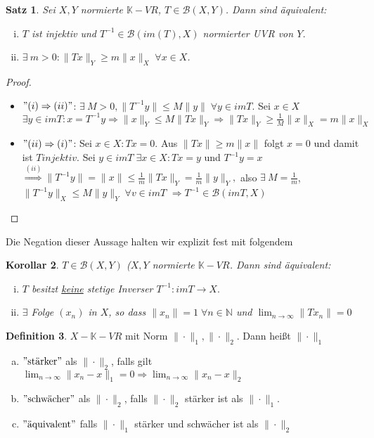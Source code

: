 \documentclass[ngerman]{report}
\theoremstyle{plain}%
\newtheorem{thm}{Satz}[chapter]
\newtheorem{cor}[thm]{Korollar}
\theoremstyle{definition}%
\newtheorem{definition}[thm]{Definition}
\theoremstyle{myStyle}
\newcommand{\N}{\mathbb{N}}
\newcommand{\K}{\mathbb{K}}
\newcommand{\B}{\mathcal{B}} %
\newcommand{\BS}[1][X,Y]{\mathcal{B}(#1)} %
\newcommand{\norm}[1]{\|#1\|}
\newcommand{\df}[1][]{%
	\overset{#1}{\Rightarrow}
}
\newcommand{\limes}[1][\infty]{\lim_{n \to #1}}
\newcommand{\inv}[1]{#1^{-1}}
\newcommand{\disp}{\displaystyle}
\newcommand{\qmarks}[1]{$"\text{#1}"$}
\begin{document}
	\begin{thm}
		Sei $X,Y$ normierte $\K-VR$, $T\in \BS$. Dann sind äquivalent:
			\begin{enumerate}[(i)]
				\item $T$ ist injektiv und $\inv{T} \in\B(im(T), X)$ normierter UVR von $Y$.
				\item $\exists \: m > 0: \norm{Tx}_Y \geq m\norm{x}_X \; \forall x\in X$.
			\end{enumerate}
	\end{thm}
	\begin{proof}
		\begin{itemize}[]
			\item $"(i)\df (ii)"$: $\exists \: M>0, \norm{\inv{T}y} \leq M\norm{y} \; \forall y\in imT.$
				Sei $x\in X$ $\exists y\in imT: x = \inv{T}y \df \norm{x}_Y \leq M \norm{Tx}_Y 
				\df \norm{Tx}_Y \geq \frac{1}{M} \norm{x}_X = m\norm{x}_X$
			\item $"(ii) \df (i)"$: Sei $x\in X: Tx = 0$.
				Aus $\norm{Tx} \geq m \norm{x}$ folgt $x = 0$ und damit ist $T injektiv$.
				Sei $y\in imT \; \exists x\in X: Tx = y$ und $\inv{T}y = x $
				$\df[(ii)] \norm{\inv{T}y} = \norm{x} \leq \frac{1}{m} \norm{Tx}_Y = \frac{1}{m} \norm{y}_Y,$
				also $\exists\: M = \frac{1}{m}$, $\norm{\inv{T}y}_X \leq M\norm{y}_Y \; \forall v\in imT$
				$\df \inv{T} \in \B(imT,X)$
		\end{itemize}
	\end{proof}
Die Negation dieser Aussage halten wir explizit fest mit folgendem 
	\begin{cor}
		$T \in \BS$ ($X,Y$ normierte $\K-VR$. Dann sind äquivalent:
			\begin{enumerate}[(i)]
				\item $T$ besitzt \underline{keine} stetige Inverser 
					$\inv{T} : imT\to X.$
				\item $\exists$ Folge $(x_n)$ in $X$, so dass $\norm{x_n} = 1 \; \forall n\in \N$
					und $\disp \limes \norm{T x_n} = 0$
			\end{enumerate}
	\end{cor}

	\begin{definition}
		$X-\K-VR$ mit Norm $\norm{\cdot}_1,\norm{\cdot}_2$. Dann heißt $\norm{\cdot}_1$ 
			\begin{enumerate}[(a)]
				\item \qmarks{stärker} als $\norm{\cdot}_2$, falls gilt
					$\disp \limes \norm{x_n - x}_1 = 0 \df \limes \norm{x_n - x}_2$
				\item \qmarks{schwächer} als $\norm{\cdot}_2$, falls $\norm{\cdot}_2$ stärker ist als $\norm{\cdot}_1$.
				\item \qmarks{äquivalent} falls $\norm{\cdot}_1$ stärker und schwächer ist als $\norm{\cdot}_2$
			\end{enumerate}
	\end{definition}
\end{document}
